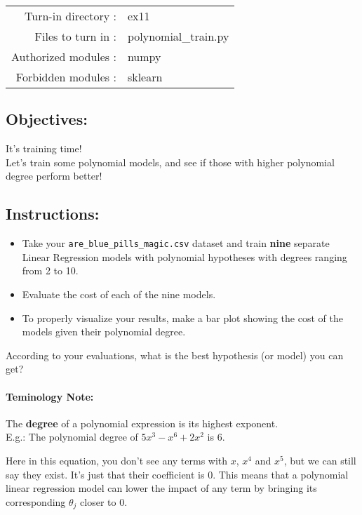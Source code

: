 \documentclass[]{article}
\let\oldparagraph\paragraph
\renewcommand{\paragraph}[1]{\oldparagraph{#1}\mbox{}}
\begin{document}
\begin{longtable}[]{@{}rl@{}}
\toprule
\endhead
Turn-in directory : & ex11\tabularnewline
Files to turn in : & polynomial\_train.py\tabularnewline
Authorized modules : & numpy\tabularnewline
Forbidden modules : & sklearn\tabularnewline
\bottomrule
\end{longtable}

\hypertarget{objectives-8}{%
\subsection{Objectives:}\label{objectives-8}}

It's training time!\\
Let's train some polynomial models, and see if those with higher
polynomial degree perform better!

\hypertarget{instructions-11}{%
\subsection{Instructions:}\label{instructions-11}}

\begin{itemize}
\item
  Take your \texttt{are\_blue\_pills\_magic.csv} dataset and train
  \textbf{nine} separate Linear Regression models with polynomial
  hypotheses with degrees ranging from 2 to 10.
\item
  Evaluate the cost of each of the nine models.
\item
  To properly visualize your results, make a bar plot showing the cost
  of the models given their polynomial degree.
\end{itemize}

According to your evaluations, what is the best hypothesis (or model)
you can get?

\hypertarget{teminology-note}{%
\paragraph{Teminology Note:}\label{teminology-note}}

The \textbf{degree} of a polynomial expression is its highest
exponent.\\
E.g.: The polynomial degree of \(5x^3 - x^6 + 2 x^2\) is \(6\).

Here in this equation, you don't see any terms with \(x\), \(x^4\) and
\(x^5\), but we can still say they exist. It's just that their
coefficient is \(0\). This means that a polynomial linear regression
model can lower the impact of any term by bringing its corresponding
\(\theta_j\) closer to \(0\).
\end{document}
